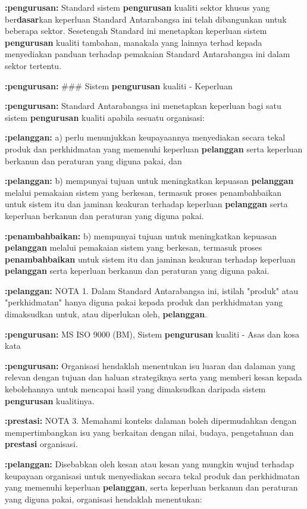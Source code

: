 \documentclass{article}
\begin{document}
\textbf{:pengurusan:} Standard sistem \textbf{pengurusan} kualiti sektor khusus yang ber\textbf{dasar}kan keperluan Standard
Antarabangsa ini telah dibangunkan untuk beberapa sektor. Sesetengah Standard ini
menetapkan keperluan sistem \textbf{pengurusan} kualiti tambahan, manakala yang lainnya terhad
kepada menyediakan panduan terhadap pemakaian Standard Antarabangsa ini dalam sektor
tertentu.

\textbf{:pengurusan:} 
\#\#\# Sistem \textbf{pengurusan} kualiti - Keperluan

\textbf{:pengurusan:} Standard Antarabangsa ini menetapkan keperluan bagi satu sistem \textbf{pengurusan} kualiti
apabila sesuatu organisasi:

\textbf{:pelanggan:} a) perlu menunjukkan keupayaannya menyediakan secara tekal produk dan perkhidmatan
yang memenuhi keperluan \textbf{pelanggan} serta keperluan berkanun dan peraturan yang
diguna pakai, dan

\textbf{:pelanggan:} b) mempunyai tujuan untuk meningkatkan kepuasan \textbf{pelanggan} melalui pemakaian sistem
yang berkesan, termasuk proses penambahbaikan untuk sistem itu dan jaminan
keakuran terhadap keperluan \textbf{pelanggan} serta keperluan berkanun dan peraturan yang
diguna pakai.

\textbf{:penambahbaikan:} b) mempunyai tujuan untuk meningkatkan kepuasan \textbf{pelanggan} melalui pemakaian sistem
yang berkesan, termasuk proses \textbf{penambahbaikan} untuk sistem itu dan jaminan
keakuran terhadap keperluan \textbf{pelanggan} serta keperluan berkanun dan peraturan yang
diguna pakai.

\textbf{:pelanggan:} NOTA 1. Dalam Standard Antarabangsa ini, istilah "produk" atau "perkhidmatan" hanya diguna pakai
kepada produk dan perkhidmatan yang dimaksudkan untuk, atau diperlukan oleh, \textbf{pelanggan}.

\textbf{:pengurusan:} MS ISO 9000 (BM), Sistem \textbf{pengurusan} kualiti - Asas dan kosa kata

\textbf{:pengurusan:} Organisasi hendaklah menentukan isu luaran dan dalaman yang relevan dengan tujuan dan
haluan strategiknya serta yang memberi kesan kepada kebolehannya untuk mencapai hasil
yang dimaksudkan daripada sistem \textbf{pengurusan} kualitinya.

\textbf{:prestasi:} NOTA 3. Memahami konteks dalaman boleh dipermudahkan dengan mempertimbangkan isu yang
berkaitan dengan nilai, budaya, pengetahuan dan \textbf{prestasi} organisasi.

\textbf{:pelanggan:} Disebabkan oleh kesan atau kesan yang mungkin wujud terhadap keupayaan organisasi
untuk menyediakan secara tekal produk dan perkhidmatan yang memenuhi keperluan
\textbf{pelanggan}, serta keperluan berkanun dan peraturan yang diguna pakai, organisasi hendaklah
menentukan:
\end{document}
